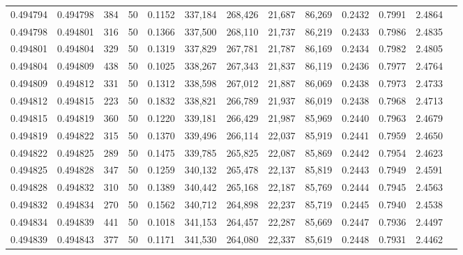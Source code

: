 \begin{tabular}{rrrrrrrrrrrrr}
0.494794 & 0.494798 &   384 &  50 &                                     0.1152 & 337,184 & 268,426 &  21,687 &  86,269 & 0.2432 & 0.7991 & 2.4864 \\
0.494798 & 0.494801 &   316 &  50 &                                     0.1366 & 337,500 & 268,110 &  21,737 &  86,219 & 0.2433 & 0.7986 & 2.4835 \\
0.494801 & 0.494804 &   329 &  50 &                                     0.1319 & 337,829 & 267,781 &  21,787 &  86,169 & 0.2434 & 0.7982 & 2.4805 \\
0.494804 & 0.494809 &   438 &  50 &                                     0.1025 & 338,267 & 267,343 &  21,837 &  86,119 & 0.2436 & 0.7977 & 2.4764 \\
0.494809 & 0.494812 &   331 &  50 &                                     0.1312 & 338,598 & 267,012 &  21,887 &  86,069 & 0.2438 & 0.7973 & 2.4733 \\
0.494812 & 0.494815 &   223 &  50 &                                     0.1832 & 338,821 & 266,789 &  21,937 &  86,019 & 0.2438 & 0.7968 & 2.4713 \\
0.494815 & 0.494819 &   360 &  50 &                                     0.1220 & 339,181 & 266,429 &  21,987 &  85,969 & 0.2440 & 0.7963 & 2.4679 \\
0.494819 & 0.494822 &   315 &  50 &                                     0.1370 & 339,496 & 266,114 &  22,037 &  85,919 & 0.2441 & 0.7959 & 2.4650 \\
0.494822 & 0.494825 &   289 &  50 &                                     0.1475 & 339,785 & 265,825 &  22,087 &  85,869 & 0.2442 & 0.7954 & 2.4623 \\
0.494825 & 0.494828 &   347 &  50 &                                     0.1259 & 340,132 & 265,478 &  22,137 &  85,819 & 0.2443 & 0.7949 & 2.4591 \\
0.494828 & 0.494832 &   310 &  50 &                                     0.1389 & 340,442 & 265,168 &  22,187 &  85,769 & 0.2444 & 0.7945 & 2.4563 \\
0.494832 & 0.494834 &   270 &  50 &                                     0.1562 & 340,712 & 264,898 &  22,237 &  85,719 & 0.2445 & 0.7940 & 2.4538 \\
0.494834 & 0.494839 &   441 &  50 &                                     0.1018 & 341,153 & 264,457 &  22,287 &  85,669 & 0.2447 & 0.7936 & 2.4497 \\
0.494839 & 0.494843 &   377 &  50 &                                     0.1171 & 341,530 & 264,080 &  22,337 &  85,619 & 0.2448 & 0.7931 & 2.4462 \\

\end{tabular}
